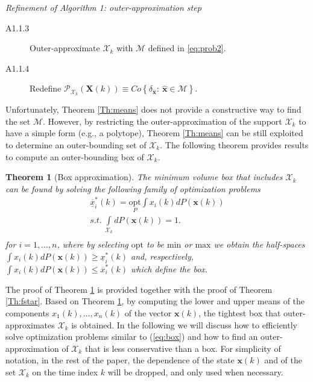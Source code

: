 \documentclass[twocolumn]{autart}
\newtheorem{theorem}{Theorem}
\newcommand{\DP}[1]{{#1}}
\begin{document}
  \begin{algorithm} \emph{Refinement of Algorithm 1: outer-approximation step}  \\
\begin{description}
   \item[A1.1.3] Outer-approximate $\mathcal{X}_k$ with  $\mathcal{M}$ defined in \eqref{eq:prob2}.
   \item[A1.1.4]  Redefine $\mathcal{P}_{\mathcal{X}_k}(\mathbf{X}(k))\equiv Co\left\{\delta_{\hat{\mathbf{x}}}:~\hat{\mathbf{x}}\in  \mathcal{M}\right\}$.
  \end{description}
\end{algorithm}

Unfortunately, Theorem \ref{Th:means} does not provide a constructive way to find the set $\mathcal{M}$. However, by restricting the outer-approximation  of the support $\mathcal{X}_k$ to have a simple form (e.g., a polytope),
Theorem \ref{Th:means} can be still exploited   to determine an outer-bounding set of  $\mathcal{X}_k$. \DP{The following theorem provides results to compute an outer-bounding box of $\mathcal{X}_k$.}

\begin{theorem}[Box approximation]
\label{th:box}
 The minimum volume box that includes  $\mathcal{X}_k$ can be found by solving the following family of
optimization problems
\begin{equation}
\label{eq:box}
 \begin{array}{l}
\underline{\overline{x}}_i^*(k)=\underset{P}{\text{opt}} \int x_i(k) dP(\mathbf{x}(k))  \\
s.t.~  \int\limits_{\mathcal{X}_k} dP(\mathbf{x}(k))= 1.\\
\end{array}
 \end{equation}
 for $i=1,\dots,n$, where by selecting $\text{opt}$ to be $\text{min}$ or $\text{max}$ we obtain
 the half-spaces $\int x_i(k) dP(\mathbf{x}(k))\geq \underline{{x}}_i^*(k)$ and, respectively, $\int x_i(k) dP(\mathbf{x}(k))\leq {\overline{x}}_i^*(k)$ which define the box.
\end{theorem}
The proof of     Theorem \ref{th:box} is provided together with the proof of Theorem \ref{Th:fstar}.
Based on Theorem \ref{th:box}, by computing the lower and upper means of the components $x_1(k),\ldots,x_n(k)$ of the vector $\mathbf{x}(k)$,   the tightest box that outer-approximates $\mathcal{X}_k$ is obtained.
In the following we will discuss how to efficiently solve optimization problems similar to  (\ref{eq:box}) and
how to find an outer-approximation of $\mathcal{X}_k$ that is less conservative than a box.
 For simplicity of notation, in the rest of the paper, the dependence of the state $\mathbf{x}(k)$ and of the set $\mathcal{X}_k$  on the time index $k$ will be dropped, and only used when necessary.
\end{document}
